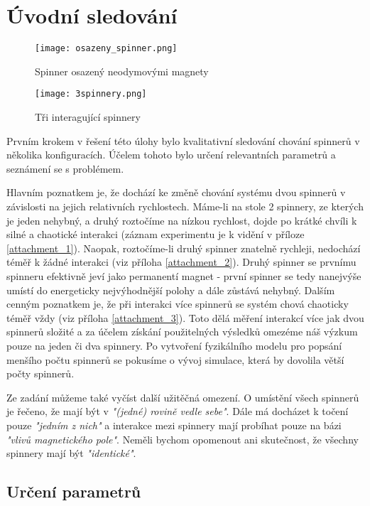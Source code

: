 \chapter{Úvodní sledování}
\begin{wrapfigure}{r}{0.4\textwidth}
    \vspace*{1cm}
    \texttt{[image: osazeny\_spinner.png]}
    \centering
    \caption{Spinner osazený neodymovými magnety}
    \label{fig:1spinner}

    \vspace*{2.5cm}
    \texttt{[image: 3spinnery.png]}
    \centering
    \caption{Tři interagující spinnery}
    \label{fig:3spinners}
\end{wrapfigure}

Prvním krokem v řešení této úlohy bylo kvalitativní sledování chování spinnerů v několika konfiguracích. Účelem tohoto bylo určení relevantních parametrů a seznámení se s problémem.

Hlavním poznatkem je, že dochází ke změně chování systému dvou spinnerů v závislosti na jejich relativních rychlostech.
Máme-li na stole 2 spinnery, ze kterých je jeden nehybný, a druhý roztočíme na nízkou rychlost, dojde po krátké chvíli k silné a chaotické interakci (záznam experimentu je k vidění v příloze \ref{attachment_1}).
Naopak, roztočíme-li druhý spinner znatelně rychleji, nedochází téměř k žádné interakci (viz příloha \ref{attachment_2}).
Druhý spinner se prvnímu spinneru efektivně jeví jako permanentí magnet - první spinner se tedy nanejvýše umístí do energeticky nejvýhodnější polohy a dále zůstává nehybný.
Dalším cenným poznatkem je, že při interakci více spinnerů se systém chová chaoticky téměř vždy (viz příloha \ref{attachment_3}).
Toto dělá měření interakcí více jak dvou spinnerů složité a za účelem získání použitelných výsledků omezéme náš výzkum pouze na jeden či dva spinnery.
Po vytvoření fyzikálního modelu pro popsání menšího počtu spinnerů se pokusíme o vývoj simulace, která by dovolila větší počty spinnerů.

Ze zadání můžeme také vyčíst další užitěčná omezení.
O umístění všech spinnerů je řečeno, že mají být v \textit{"(jedné) rovině vedle sebe"}. Dále má docházet k točení pouze \textit{"jedním z nich"} a interakce mezi spinnery mají probíhat pouze na bázi \textit{"vlivů magnetického pole"}.
Neměli bychom opomenout ani skutečnost, že všechny spinnery mají být \textit{"identické"}.
\clearpage

\section{Určení parametrů}

